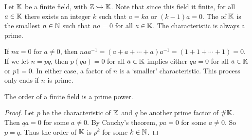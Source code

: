 Let $\mathbb{K}$ be a finite field, with $\mathbb{Z} \hookrightarrow \mathbb{K}$. Note that since this field it finite, for all $a \in \mathbb{K}$ there exists an integer $k$ such that $a = ka$ or $(k-1)a = 0$. The  of $\mathbb{K}$ is the smallest $n \in \mathbb{N}$ such that $na = 0$ for all $a \in \mathbb{K}$. The characteristic is always a prime.

If $na = 0$ for $a \neq 0$, then $na a^{-1} = (a + a + \cdots + a) a^{-1} = (1 + 1 + \cdots + 1) = 0$. If we let $n = pq$, then $p(qa) = 0$ for all $a \in \mathbb{K}$ implies either $qa = 0$ for all $a \in \mathbb{K}$ or $p 1 = 0$. In either case, a factor of $n$ is a `smaller' characteristic. This process only ends if $n$ is prime.

\begin{proposition}
    The order of a finite field is a prime power.
\end{proposition}
\begin{proof}
    Let $p$ be the characteristic of $\mathbb{K}$ and $q$ be another prime factor of $\# \mathbb{K}$. Then $qa = 0$ for some $a \neq 0$. By Cauchy's theorem, $pa = 0$ for some $a \neq 0$. So $p = q$. Thus the order of $\mathbb{K}$ is $p^{k}$ for some $k \in \mathbb{N}$.
\end{proof}